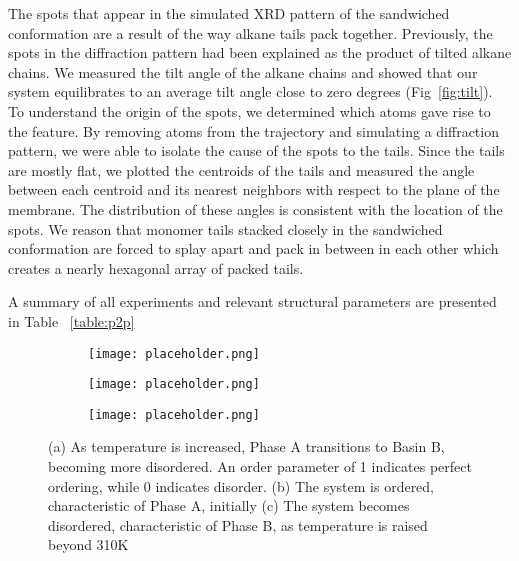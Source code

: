 The spots that appear in the simulated XRD pattern of the sandwiched
conformation are a result of the way alkane tails pack together. Previously,
the spots in the diffraction pattern had been explained as the product of
tilted alkane chains. We measured the tilt angle of the alkane chains and 
showed that our system equilibrates to an average tilt angle close to zero 
degrees (Fig~\ref{fig:tilt}). To understand the origin of the spots, we 
determined which atoms gave rise to the feature. By removing atoms from 
the trajectory and simulating a diffraction pattern, we were able to isolate
the cause of the spots to the tails. Since the tails are mostly flat, we
plotted the centroids of the tails and measured the angle between each centroid 
and its nearest neighbors with respect to the plane of the membrane. The 
distribution of these angles is consistent with the location of the spots.
We reason that monomer tails stacked closely in the sandwiched conformation
are forced to splay apart and pack in between in each other which creates a
nearly hexagonal array of packed tails. 

A summary of all experiments and relevant structural parameters are presented in Table ~\ref{table:p2p}

\begin{figure}
	\centering
	\begin{subfigure}{0.3\textwidth}
		\centering
		\texttt{[image: placeholder.png]}
		\caption{}\label{fig:orderparameter}
	\end{subfigure}
	\begin{subfigure}{0.3\textwidth}
		\centering
		\texttt{[image: placeholder.png]}
		\caption{}\label{fig:order}
	\end{subfigure}
	\begin{subfigure}{0.3\textwidth}
		\centering
		\texttt{[image: placeholder.png]}
		\caption{}\label{fig:disorder}
	\end{subfigure}
	\caption{(a) As temperature is increased, Phase A transitions to 
	Basin B, becoming more disordered. An order parameter of 1 indicates perfect ordering, while 0 indicates disorder. (b) The system is ordered, characteristic of Phase A, initially (c) The system becomes disordered, characteristic of Phase B, as temperature is raised beyond 310K}\label{fig:transition}
\end{figure}	

